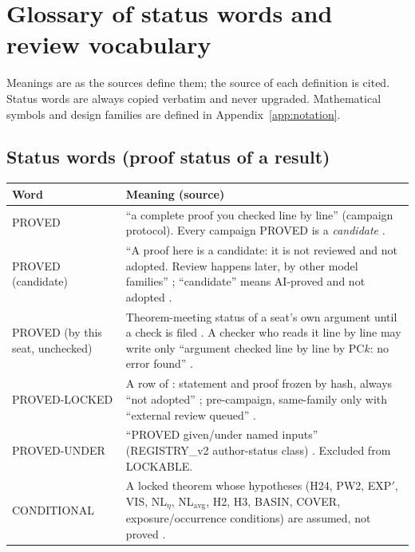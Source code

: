 \section{Glossary of status words and review vocabulary}\label{app:glossary}

Meanings are as the sources define them; the source of each definition is cited. Status words are always copied verbatim and never upgraded. Mathematical symbols and design families are defined in Appendix~\ref{app:notation}.

\subsection{Status words (proof status of a result)}
{\small
\begin{xltabular}{\textwidth}{@{}>{\raggedright\arraybackslash}p{4.4cm}>{\raggedright\arraybackslash}X@{}}
\toprule
\textbf{Word} & \textbf{Meaning (source)} \\
\midrule
\endhead
PROVED & ``a complete proof you checked line by line'' (campaign protocol). Every campaign PROVED is a \emph{candidate} . \\
PROVED (candidate) & ``A proof here is a candidate: it is not reviewed and not adopted. Review happens later, by other model families'' ; ``candidate'' means AI-proved and not adopted . \\
PROVED (by this seat, unchecked) & Theorem-meeting status of a seat's own argument until a check is filed . A checker who reads it line by line may write only ``argument checked line by line by PC$k$: no error found'' . \\
PROVED-LOCKED & A row of : statement and proof frozen by hash, always ``not adopted'' ; pre-campaign, same-family only with ``external review queued'' . \\
PROVED-UNDER & ``PROVED given/under named inputs'' (REGISTRY\_v2 author-status class) . Excluded from LOCKABLE. \\
CONDITIONAL & A locked theorem whose hypotheses (H24, PW2, EXP$'$, VIS, NL$_\eta$, NL$_{\mathrm{avg}}$, H2, H3, BASIN, COVER, exposure/occurrence conditions) are assumed, not proved . \\

\end{xltabular}}
